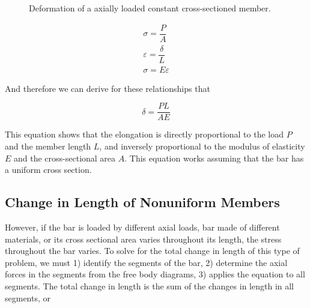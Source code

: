 \documentclass[
10pt,
a4paper,
openany,
svgnames,
]{kaobook} %
\begin{document}
\begin{figure}[h]
  \centering
  \caption{Deformation of a axially loaded constant cross-sectioned member.}
\end{figure}

\begin{gather}
 \sigma      = \dfrac{P}{A} \\
 \varepsilon = \dfrac{\delta}{L} \\
 \sigma      = E\varepsilon 
\end{gather}

And therefore we can derive for these relationships that

\begin{equation}
  \delta  = \frac{PL}{AE}
\end{equation}

This equation shows that the elongation is directly proportional to the load $P$ and the member length $L$, and inversely proportional to the modulus of elasticity $E$ and the cross-sectional area $A$. This equation works assuming that the bar has a uniform cross section.

\subsection{Change in Length of Nonuniform Members}

However, if the bar is loaded by different axial loads, bar made of different materials, or its cross sectional area varies throughout its length, the stress throughout the bar varies. To solve for the total change in length of this type of problem, we must 1) identify the segments of the bar, 2) determine the axial forces in the segments from the free body diagrams, 3) applies the equation to all segments. The total change in length is the sum of the changes in length in all segments, or
\end{document}
